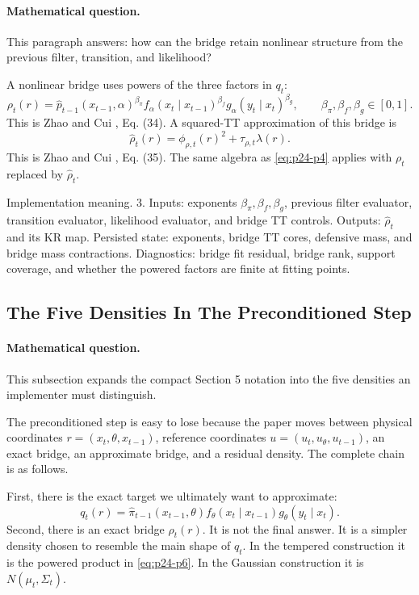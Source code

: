 \documentclass[11pt]{article}
\begin{document}
\paragraph{Mathematical question.}
This paragraph answers: how can the bridge retain nonlinear structure from
the previous filter, transition, and likelihood?

A nonlinear bridge uses powers of the three factors in \(q_t\):
\[
    \rho_t(r)
    =
    \widehat p_{t-1}(x_{t-1},\alpha)^{\beta_\pi}
    f_\alpha(x_t\mid x_{t-1})^{\beta_f}
    g_\alpha(y_t\mid x_t)^{\beta_g},
    \qquad
    \beta_\pi,\beta_f,\beta_g\in[0,1].
    \label{eq:p24-p6}
\]
This is Zhao and Cui \cite{zhao2024ttsequential}, Eq. (34).  A squared-TT approximation of this bridge is
\[
    \widehat\rho_t(r)
    =
    \phi_{\rho,t}(r)^2+\tau_{\rho,t}\lambda(r).
    \label{eq:p24-p7}
\]
This is Zhao and Cui \cite{zhao2024ttsequential}, Eq. (35).  The same algebra as \eqref{eq:p24-p4} applies with
\(\rho_t\) replaced by \(\widehat\rho_t\).

Implementation meaning. 3.  Inputs: exponents
\(\beta_\pi,\beta_f,\beta_g\), previous filter evaluator, transition evaluator,
likelihood evaluator, and bridge TT controls.  Outputs: \(\widehat\rho_t\) and
its KR map.  Persisted state: exponents, bridge TT cores, defensive mass, and
bridge mass contractions.  Diagnostics: bridge fit residual, bridge rank,
support coverage, and whether the powered factors are finite at fitting points.

\subsection{The Five Densities In The Preconditioned Step}

\paragraph{Mathematical question.}
This subsection expands the compact Section 5 notation into the five densities
an implementer must distinguish.

The preconditioned step is easy to lose because the paper moves between
physical coordinates \(r=(x_t,\theta,x_{t-1})\), reference coordinates
\(u=(u_t,u_\theta,u_{t-1})\), an exact bridge, an approximate bridge, and a
residual density.  The complete chain is as follows.

First, there is the exact target we ultimately want to approximate:
\[
    q_t(r)
    =
    \widehat\pi_{t-1}(x_{t-1},\theta)
    f_\theta(x_t\mid x_{t-1})
    g_\theta(y_t\mid x_t).
    \label{eq:p24-p7a}
\]
Second, there is an exact bridge \(\rho_t(r)\).  It is not the final answer.
It is a simpler density chosen to resemble the main shape of \(q_t\).  In the
tempered construction it is the powered product in \eqref{eq:p24-p6}.  In the Gaussian
construction it is \(N(\mu_t,\Sigma_t)\).
\end{document}
